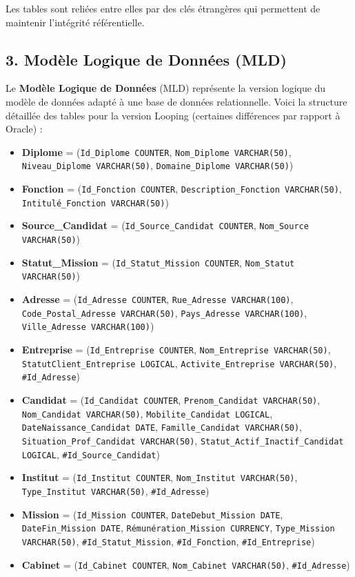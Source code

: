 \documentclass[a4paper,12pt]{article}
\begin{document}
Les tables sont reliées entre elles par des clés étrangères qui permettent de maintenir l'intégrité référentielle.

\subsection*{3. Modèle Logique de Données (MLD)}

Le \textbf{Modèle Logique de Données} (MLD) représente la version logique du modèle de données adapté à une base de données relationnelle. Voici la structure détaillée des tables pour la version Looping (certaines différences par rapport à Oracle) :

\begin{itemize}
    \item \textbf{Diplome} = (\texttt{Id\_Diplome COUNTER}, \texttt{Nom\_Diplome VARCHAR(50)}, \texttt{Niveau\_Diplome VARCHAR(50)}, \texttt{Domaine\_Diplome VARCHAR(50)})
    \item \textbf{Fonction} = (\texttt{Id\_Fonction COUNTER}, \texttt{Description\_Fonction VARCHAR(50)}, \texttt{Intitulé\_Fonction VARCHAR(50)})
    \item \textbf{Source\_Candidat} = (\texttt{Id\_Source\_Candidat COUNTER}, \texttt{Nom\_Source VARCHAR(50)})
    \item \textbf{Statut\_Mission} = (\texttt{Id\_Statut\_Mission COUNTER}, \texttt{Nom\_Statut VARCHAR(50)})
    \item \textbf{Adresse} = (\texttt{Id\_Adresse COUNTER}, \texttt{Rue\_Adresse VARCHAR(100)}, \texttt{Code\_Postal\_Adresse VARCHAR(50)}, \texttt{Pays\_Adresse VARCHAR(100)}, \texttt{Ville\_Adresse VARCHAR(100)})
    \item \textbf{Entreprise} = (\texttt{Id\_Entreprise COUNTER}, \texttt{Nom\_Entreprise VARCHAR(50)}, \texttt{StatutClient\_Entreprise LOGICAL}, \texttt{Activite\_Entreprise VARCHAR(50)}, \texttt{\#Id\_Adresse})
    \item \textbf{Candidat} = (\texttt{Id\_Candidat COUNTER}, \texttt{Prenom\_Candidat VARCHAR(50)}, \texttt{Nom\_Candidat VARCHAR(50)}, \texttt{Mobilite\_Candidat LOGICAL}, \texttt{DateNaissance\_Candidat DATE}, \texttt{Famille\_Candidat VARCHAR(50)}, \texttt{Situation\_Prof\_Candidat VARCHAR(50)}, \texttt{Statut\_Actif\_Inactif\_Candidat LOGICAL}, \texttt{\#Id\_Source\_Candidat})
    \item \textbf{Institut} = (\texttt{Id\_Institut COUNTER}, \texttt{Nom\_Institut VARCHAR(50)}, \texttt{Type\_Institut VARCHAR(50)}, \texttt{\#Id\_Adresse})
    \item \textbf{Mission} = (\texttt{Id\_Mission COUNTER}, \texttt{DateDebut\_Mission DATE}, \texttt{DateFin\_Mission DATE}, \texttt{Rémunération\_Mission CURRENCY}, \texttt{Type\_Mission VARCHAR(50)}, \texttt{\#Id\_Statut\_Mission}, \texttt{\#Id\_Fonction}, \texttt{\#Id\_Entreprise})
    \item \textbf{Cabinet} = (\texttt{Id\_Cabinet COUNTER}, \texttt{Nom\_Cabinet VARCHAR(50)}, \texttt{\#Id\_Adresse})
\end{itemize}
\end{document}
